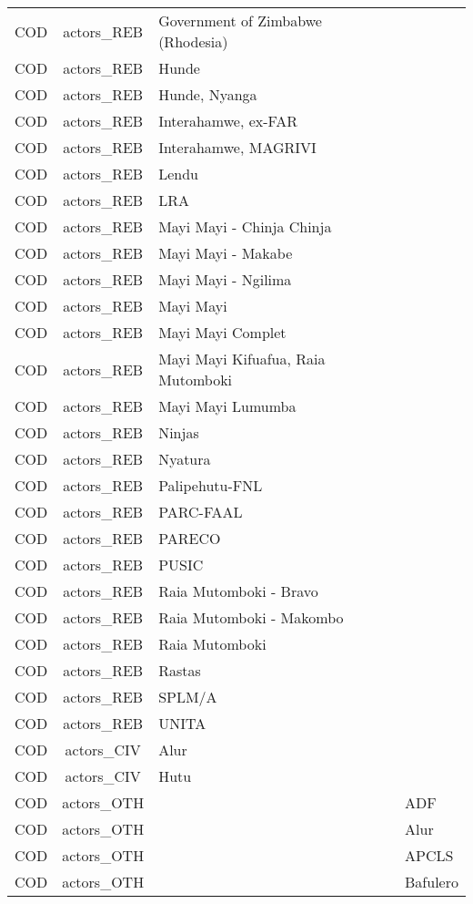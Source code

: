 \documentclass[12pt]{article}
\begin{document}
\begin{center}
\begin{longtable}{|c|c|p{7cm}|p{7cm}|}
  COD & actors\_REB & Government of Zimbabwe (Rhodesia) &  \\ 
  COD & actors\_REB & Hunde &  \\ 
  COD & actors\_REB & Hunde, Nyanga &  \\ 
  COD & actors\_REB & Interahamwe, ex-FAR &  \\ 
  COD & actors\_REB & Interahamwe, MAGRIVI &  \\ 
  COD & actors\_REB & Lendu &  \\ 
  COD & actors\_REB & LRA &  \\ 
  COD & actors\_REB & Mayi Mayi - Chinja Chinja &  \\ 
  COD & actors\_REB & Mayi Mayi - Makabe &  \\ 
  COD & actors\_REB & Mayi Mayi - Ngilima &  \\ 
  COD & actors\_REB & Mayi Mayi &  \\ 
  COD & actors\_REB & Mayi Mayi Complet &  \\ 
  COD & actors\_REB & Mayi Mayi Kifuafua, Raia Mutomboki &  \\ 
  COD & actors\_REB & Mayi Mayi Lumumba &  \\ 
  COD & actors\_REB & Ninjas &  \\ 
  COD & actors\_REB & Nyatura &  \\ 
  COD & actors\_REB & Palipehutu-FNL &  \\ 
  COD & actors\_REB & PARC-FAAL &  \\ 
  COD & actors\_REB & PARECO &  \\ 
  COD & actors\_REB & PUSIC &  \\ 
  COD & actors\_REB & Raia Mutomboki - Bravo &  \\ 
  COD & actors\_REB & Raia Mutomboki - Makombo &  \\ 
  COD & actors\_REB & Raia Mutomboki &  \\ 
  COD & actors\_REB & Rastas &  \\ 
  COD & actors\_REB & SPLM/A &  \\ 
  COD & actors\_REB & UNITA &  \\ 
  COD & actors\_CIV & Alur &  \\ 
  COD & actors\_CIV & Hutu &  \\ 
  COD & actors\_OTH &  & ADF \\ 
  COD & actors\_OTH &  & Alur \\ 
  COD & actors\_OTH &  & APCLS \\ 
  COD & actors\_OTH &  & Bafulero \\ 

\end{longtable}
\end{center}
\end{document}
